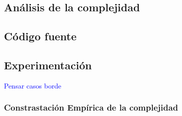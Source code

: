 \subsection{Análisis de la complejidad}

\subsection{Código fuente}

\subsection{Experimentación}
\textcolor{blue}{Pensar casos borde}

\subsubsection{Constrastación Empírica de la complejidad}

